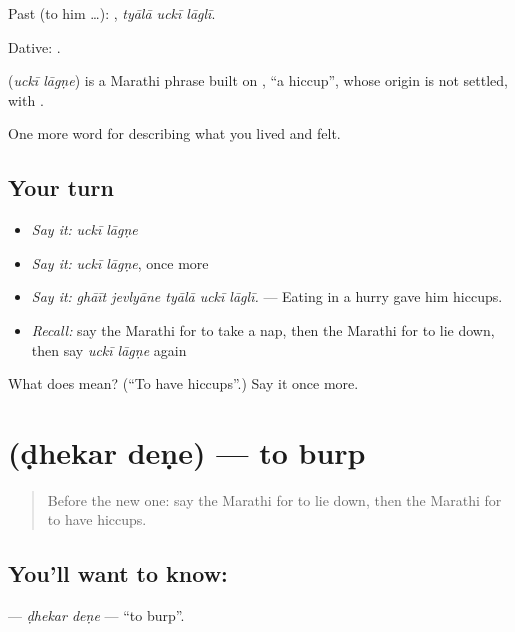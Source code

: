 Past (to him …):   , \emph{tyālā uckī lāglī}.

Dative:   .

\begin{cousinweb}
\textbf{ } (\emph{uckī lāgṇe}) is a Marathi phrase built on , \textquotedblleft{}a hiccup\textquotedblright{}, whose origin is not settled, with .
\end{cousinweb}

\begin{grammarlens}[title={What you've built}]
One more word for describing what you lived and felt.
\end{grammarlens}

\subsection*{Your turn}
\begin{itemize}
\raggedright
  \item \emph{Say it:} \emph{uckī lāgṇe}
  \item \emph{Say it:} \emph{uckī lāgṇe}, once more
  \item \emph{Say it:} \emph{ghāīt jevlyāne tyālā uckī lāglī.} — Eating in a hurry gave him hiccups.
  \item \emph{Recall:} say the Marathi for to take a nap, then the Marathi for to lie down, then say \emph{uckī lāgṇe} again
\end{itemize}

\begin{tcolorbox}[breakable,colback=teal!4,colframe=teal!35!black,title={Before you move on}]
What does   mean? (\textquotedblleft{}To have hiccups\textquotedblright{}.) Say it once more.
\end{tcolorbox}
\section[\texorpdfstring{\mr{ढेकर} \mr{देणे} (ḍhekar deṇe)}{ढेकर देणे (ḍhekar deṇe)}]{  (ḍhekar deṇe) — to burp}

\label{lesson:MR-C492-dhekar-dene}



\begin{quote}
Before the new one: say the Marathi for to lie down, then the Marathi for to have hiccups.
\end{quote}

\subsection*{You'll want to know:  }
\textbf{ } — \emph{ḍhekar deṇe} — \textquotedblleft{}to burp\textquotedblright{}.

